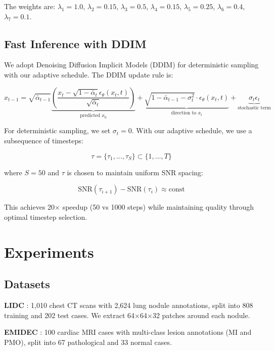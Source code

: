\documentclass[10pt,twocolumn,letterpaper]{article}
\begin{document}
The weights are: $\lambda_1=1.0$, $\lambda_2=0.15$, $\lambda_3=0.5$, $\lambda_4=0.15$, $\lambda_5=0.25$, $\lambda_6=0.4$, $\lambda_7=0.1$.

\subsection{Fast Inference with DDIM}

We adopt Denoising Diffusion Implicit Models (DDIM) for deterministic sampling with our adaptive schedule. The DDIM update rule is:

\begin{equation}
x_{t-1} = \sqrt{\bar{\alpha}_{t-1}} \underbrace{\left(\frac{x_t - \sqrt{1-\bar{\alpha}_t}\epsilon_\theta(x_t, t)}{\sqrt{\bar{\alpha}_t}}\right)}_{\text{predicted } x_0} + \underbrace{\sqrt{1-\bar{\alpha}_{t-1} - \sigma_t^2} \cdot \epsilon_\theta(x_t, t)}_{\text{direction to } x_t} + \underbrace{\sigma_t \epsilon_t}_{\text{stochastic term}}
\end{equation}

For deterministic sampling, we set $\sigma_t = 0$. With our adaptive schedule, we use a subsequence of timesteps:

\begin{equation}
\tau = \{\tau_1, ..., \tau_S\} \subset \{1, ..., T\}
\end{equation}

where $S=50$ and $\tau$ is chosen to maintain uniform SNR spacing:

\begin{equation}
\text{SNR}(\tau_{i+1}) - \text{SNR}(\tau_i) \approx \text{const}
\end{equation}

This achieves 20× speedup (50 vs 1000 steps) while maintaining quality through optimal timestep selection.

\section{Experiments}

\subsection{Datasets}

\textbf{LIDC} \cite{armato2011lung}: 1,010 chest CT scans with 2,624 lung nodule annotations, split into 808 training and 202 test cases. We extract 64×64×32 patches around each nodule.

\textbf{EMIDEC} \cite{lalande2022emidec}: 100 cardiac MRI cases with multi-class lesion annotations (MI and PMO), split into 67 pathological and 33 normal cases.
\end{document}

